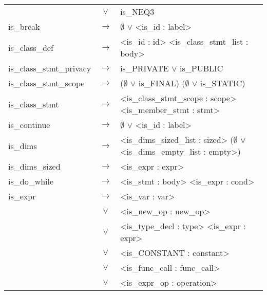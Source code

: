 \documentclass[a4paper]{article}
\begin{document}
\begin{longtable}{lcl}
								& $\vee$ & is\_NEQ3 \\
	is\_break 					& $\to$ & $\emptyset$ $\vee$ <is\_id : label> \\
	is\_class\_def				& $\to$ & <is\_id : id> <is\_class\_stmt\_list : body> \\
	is\_class\_stmt\_privacy	& $\to$ & is\_PRIVATE $\vee$ is\_PUBLIC\\	
	is\_class\_stmt\_scope		& $\to$ &($\emptyset$ $\vee$ is\_FINAL) ($\emptyset$ $\vee$ is\_STATIC) \\
	is\_class\_stmt 			& $\to$ & <is\_class\_stmt\_scope : scope> <is\_member\_stmt : stmt> \\
	is\_continue				& $\to$ & $\emptyset$ $\vee$ <is\_id : label> \\
	is\_dims					& $\to$ & <is\_dims\_sized\_list : sized> ($\emptyset$ $\vee$ <is\_dims\_empty\_list : empty>) \\
	is\_dims\_sized				& $\to$ & <is\_expr : expr> \\
	is\_do\_while				& $\to$ & <is\_stmt : body> <is\_expr : cond> \\
	is\_expr					& $\to$ & <is\_var : var> \\
								& $\vee$ & <is\_new\_op : new\_op> \\
								& $\vee$ & <is\_type\_decl : type> <is\_expr : expr>\\
								& $\vee$ & <is\_CONSTANT : constant> \\
								& $\vee$ & <is\_func\_call : func\_call> \\
								& $\vee$ & <is\_expr\_op : operation> \\


\end{longtable}
\end{document}
